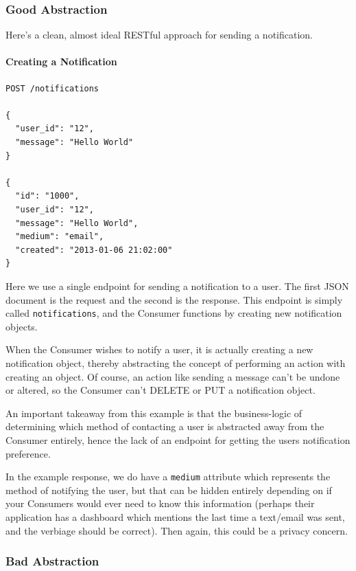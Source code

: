 \documentclass{book}
\begin{document}
\subsubsection{Good Abstraction}

Here's a clean, almost ideal RESTful approach for sending a notification.

\paragraph{\textbf{Creating a Notification}}

\begin{verbatim}
POST /notifications

{
  "user_id": "12",
  "message": "Hello World"
}

{
  "id": "1000",
  "user_id": "12",
  "message": "Hello World",
  "medium": "email",
  "created": "2013-01-06 21:02:00"
}
\end{verbatim}

Here we use a single endpoint for sending a notification to a user. The first JSON document is the request and the second is the response. This endpoint is simply called \texttt{notifications}, and the Consumer functions by creating new notification objects.

When the Consumer wishes to notify a user, it is actually creating a new notification object, thereby abstracting the concept of performing an action with creating an object. Of course, an action like sending a message can't be undone or altered, so the Consumer can't DELETE or PUT a notification object.

An important takeaway from this example is that the business-logic of determining which method of contacting a user is abstracted away from the Consumer entirely, hence the lack of an endpoint for getting the users notification preference.

In the example response, we do have a \texttt{medium} attribute which represents the method of notifying the user, but that can be hidden entirely depending on if your Consumers would ever need to know this information (perhaps their application has a dashboard which mentions the last time a text/email was sent, and the verbiage should be correct). Then again, this could be a privacy concern.

\subsubsection{Bad Abstraction}
\end{document}
